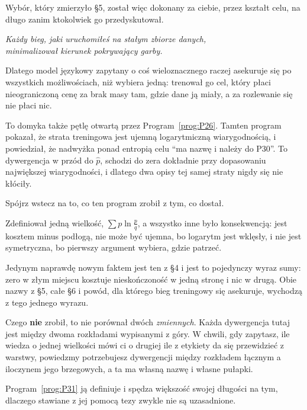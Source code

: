 \begin{fr}
Wybór, który zmierzyło §5, został więc dokonany za ciebie, przez kształt
celu, na długo zanim ktokolwiek go przedyskutował.

\begin{center}
\emph{Każdy bieg, jaki uruchomiłeś na stałym zbiorze danych,\\
minimalizował kierunek pokrywający garby.}
\end{center}

Dlatego model językowy zapytany o coś wieloznacznego raczej asekuruje się
po wszystkich możliwościach, niż wybiera jedną: trenował go cel, który płaci
nieograniczoną cenę za brak masy tam, gdzie dane ją miały, a za rozlewanie
się nie płaci nic.

\begin{note}
To domyka także pętlę otwartą przez Program~\ref{prog:P26}. Tamten program
pokazał, że strata treningowa jest ujemną logarytmiczną wiarygodnością, i
powiedział, że nadwyżka ponad entropią celu \enquote{ma nazwę i należy do
P30}. To dywergencja w przód do $\hat p$, schodzi do zera dokładnie przy
dopasowaniu największej wiarygodności, i dlatego dwa opisy tej samej straty
nigdy się nie kłóciły.
\end{note}
\end{fr}

\begin{fr}
Spójrz wstecz na to, co ten program zrobił z tym, co dostał.

Zdefiniował jedną wielkość, $\sum p \ln \frac{p}{q}$, a wszystko inne było
konsekwencją: jest kosztem minus podłogą, nie może być ujemna, bo logarytm
jest wklęsły, i nie jest symetryczna, bo pierwszy argument wybiera, gdzie
patrzeć.

Jedynym naprawdę nowym faktem jest ten z §4 i jest to pojedynczy wyraz sumy:
zero w złym miejscu kosztuje nieskończoność w jedną stronę i nic w drugą.
Obie nazwy z §5, całe §6 i powód, dla którego bieg treningowy się asekuruje,
wychodzą z tego jednego wyrazu.

Czego \textbf{nie} zrobił, to nie porównał dwóch \emph{zmiennych}. Każda
dywergencja tutaj jest między dwoma rozkładami wypisanymi z góry. W chwili,
gdy zapytasz, ile wiedza o jednej wielkości mówi ci o drugiej \dash{} ile z
etykiety da się przewidzieć z warstwy, powiedzmy \dash{} potrzebujesz
dywergencji między rozkładem łącznym a iloczynem jego brzegowych, a ta ma
własną nazwę i własne pułapki.

Program~\ref{prog:P31} ją definiuje i spędza większość swojej długości na
tym, dlaczego stawiane z jej pomocą tezy zwykle nie są uzasadnione.
\end{fr}

